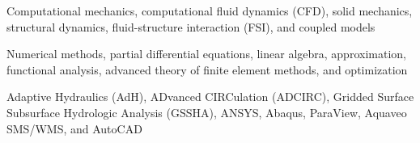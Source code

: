 \documentclass[letterpaper,10pt]{article}
\begin{document}
      \resumeItemListEnd

      \resumeItemListStart
          {Computational mechanics, computational fluid dynamics (CFD), solid
          mechanics, structural dynamics, fluid-structure interaction (FSI), and
          coupled models}

          {Numerical methods, partial differential equations, linear algebra,
          approximation, functional analysis, advanced theory of finite element
          methods, and optimization}

          {Adaptive Hydraulics (AdH), ADvanced CIRCulation (ADCIRC), Gridded
          Surface Subsurface Hydrologic Analysis (GSSHA), ANSYS, Abaqus,
          ParaView, Aquaveo SMS/WMS, and AutoCAD}
      \resumeItemListEnd

  \resumeSubHeadingListEnd

\vspace{-431.90pt}
\end{document}

